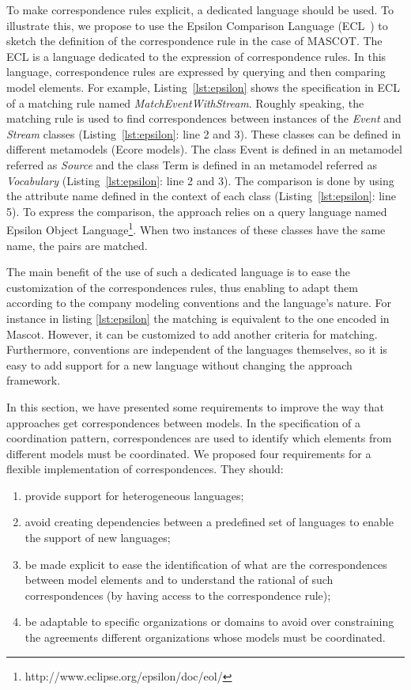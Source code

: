 To make correspondence rules explicit, a dedicated language should be used. To illustrate this, we propose to use the Epsilon Comparison Language (ECL~\cite{TODO_ECLComparisonLanguage}) to sketch the definition of the correspondence rule in the case of MASCOT. The ECL is a language dedicated to the expression of correspondence rules. In this language, correspondence rules are expressed by querying and then comparing model elements. For example, Listing~\ref{lst:epsilon} shows the specification in ECL of a matching rule named \emph{MatchEventWithStream}. Roughly speaking, the matching rule is used to find correspondences between instances of the \emph{Event} and \emph{Stream} classes (Listing~\ref{lst:epsilon}: line 2 and 3). These classes can be defined in different metamodels (\ie Ecore models). The class Event is defined in an metamodel referred as \emph{Source} and the class Term is defined in an metamodel referred as \emph{Vocabulary} (Listing~\ref{lst:epsilon}: line 2 and 3). The comparison is done by using the attribute name defined in the context of each class (Listing~\ref{lst:epsilon}: line 5). To express the comparison, the approach relies on a query language named Epsilon Object Language\footnote{http://www.eclipse.org/epsilon/doc/eol/}. When two instances of these classes have the same name, the pairs are matched.
	
The main benefit of the use of such a dedicated language is to ease the customization of the correspondences rules, thus enabling to adapt them according to the company modeling conventions and the language's nature. For instance in listing \ref{lst:epsilon} the matching is equivalent to the one encoded in Mascot. However, it can be customized to add another criteria for matching. Furthermore, conventions are independent of the languages themselves, so it is easy to add support for a new language without changing the approach framework.
	

In this section, we have presented some requirements to improve the way that approaches get correspondences between models. In the specification of a coordination pattern, correspondences are used to identify which elements from different models must be coordinated. We proposed four requirements for a flexible implementation of correspondences. They should: 
\begin{enumerate}
\item provide support for heterogeneous languages;
\item avoid creating dependencies between a predefined set of languages to enable the support of new languages;
\item be made explicit to ease the identification of what are the correspondences between model elements and to understand the rational of such correspondences (by having access to the correspondence rule);
\item be adaptable to specific organizations or domains to avoid over constraining the agreements different organizations whose models must be coordinated.
\end{enumerate}

